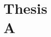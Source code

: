 \disablewr{%
}%






\headingOpenTempRight%
\part[Thesis A]{Thesis\\A}%
\headingOpenTempRestore%
\label{part:thesis}%
%
%
%
%
%
%
%
%
%
%
%
%
%
%
%
%
%
%
%
